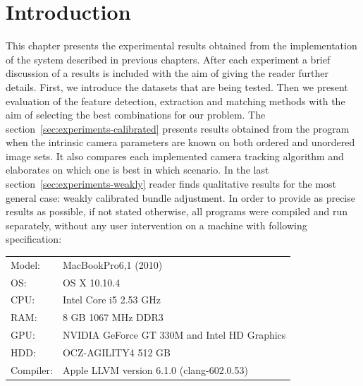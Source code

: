 \section{Introduction}
\label{sec:experiments-introduction}
This chapter presents the experimental results obtained from the implementation of the system described in previous chapters. After each experiment a brief discussion of a results is included with the aim of giving the reader further details. First, we introduce the datasets that are being tested. Then we present evaluation of the feature detection, extraction and matching methods with the aim of selecting the best combinations for our problem. The section~\ref{sec:experiments-calibrated} presents results obtained from the program when the intrinsic camera parameters are known on both ordered and unordered image sets. It also compares each implemented camera tracking algorithm and elaborates on which one is best in which scenario. In the last section~\ref{sec:experiments-weakly} reader finds qualitative results for the most general case: weakly calibrated bundle adjustment.  In order to provide as precise results as possible, if not stated otherwise, all programs were compiled and run separately, without any user intervention on a machine with following specification:
\vspace{.5cm}

\begin{tabular}{ l  l }
	Model: & MacBookPro6,1 (2010) \\
	OS: & OS X 10.10.4 \\
	CPU: & Intel Core i5 2.53 GHz \\
	RAM: & 8 GB 1067 MHz DDR3 \\
	GPU: & NVIDIA GeForce GT 330M and Intel HD Graphics  \\
	HDD: & OCZ-AGILITY4 512 GB \\
	Compiler: & Apple LLVM version 6.1.0 (clang-602.0.53) \\
\end{tabular}

